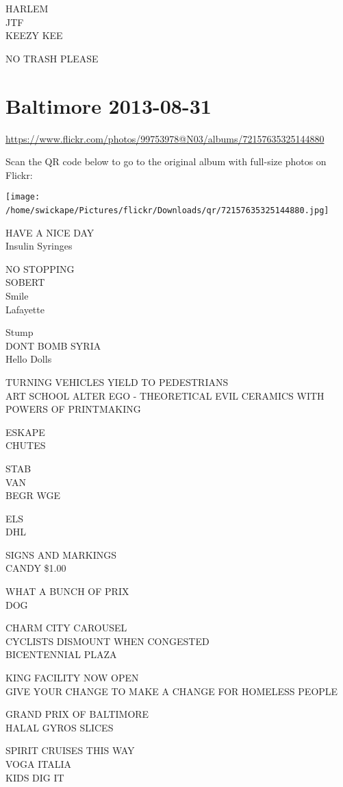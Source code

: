 \documentclass[10pt,letterpaper]{article}
\begin{document}
HARLEM\\
JTF\\
KEEZY KEE

NO TRASH PLEASE
\

\section*{Baltimore 2013-08-31}

\url{https://www.flickr.com/photos/99753978@N03/albums/72157635325144880}

Scan the QR code below to go to the original album with full-size photos on Flickr:

\texttt{[image: /home/swickape/Pictures/flickr/Downloads/qr/72157635325144880.jpg]}
\

HAVE A NICE DAY\\
Insulin Syringes

NO STOPPING\\
SOBERT\\
Smile\\
Lafayette

Stump\\
DONT BOMB SYRIA\\
Hello Dolls

TURNING VEHICLES YIELD TO PEDESTRIANS\\
ART SCHOOL ALTER EGO {-} THEORETICAL EVIL CERAMICS WITH POWERS OF PRINTMAKING

ESKAPE\\
CHUTES

STAB\\
VAN\\
BEGR WGE

ELS\\
DHL

SIGNS AND MARKINGS\\
CANDY \$1.00

WHAT A BUNCH OF PRIX\\
DOG

CHARM CITY CAROUSEL\\
CYCLISTS DISMOUNT WHEN CONGESTED\\
BICENTENNIAL PLAZA

KING FACILITY NOW OPEN\\
GIVE YOUR CHANGE TO MAKE A CHANGE FOR HOMELESS PEOPLE

GRAND PRIX OF BALTIMORE\\
HALAL GYROS SLICES

SPIRIT CRUISES THIS WAY\\
VOGA ITALIA\\
KIDS DIG IT
\end{document}
